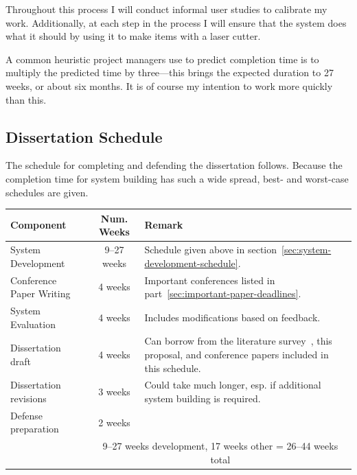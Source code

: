 \documentclass[12pt]{article}
\begin{document}
Throughout this process I will conduct informal user studies to
calibrate my work. Additionally, at each step in the process I will
ensure that the system does what it should by using it to make items
with a laser cutter. 

A common heuristic project managers use to predict completion time is
to multiply the predicted time by three---this brings the expected
duration to 27 weeks, or about six months. It is of course my
intention to work more quickly than this.


\subsection{Dissertation Schedule}

The schedule for completing and defending the dissertation
follows. Because the completion time for system building has such a
wide spread, best- and worst-case schedules are given.

\vspace{12pt}
\begin{tabular}{ | l | c | p{70mm} | }
  \hline

  \textbf{Component} & \textbf{Num. Weeks} & \textbf{Remark} \\

  \hline \hline

  System Development & 9--27 weeks & Schedule given above in
  section~\ref{sec:system-development-schedule}. \\

  Conference Paper Writing & 4 weeks & Important conferences listed in
  part~\ref{sec:important-paper-deadlines}. \\

  System Evaluation & 4 weeks & Includes modifications based on
  feedback. \\ 

  Dissertation draft & 4 weeks & Can borrow from the literature
  survey~\cite{johnson-sketch-review}, this proposal, and conference
  papers included in this schedule. \\

  Dissertation revisions & 3 weeks & Could take much longer, esp. if
  additional system building is required.\\

  Defense preparation & 2 weeks & \\

  \hline
  
  & \multicolumn{2}{|c|}{9--27 weeks development, 17 weeks other = 26--44 weeks total} \\

  \hline

\end{tabular}
\vspace{12pt}
\end{document}
